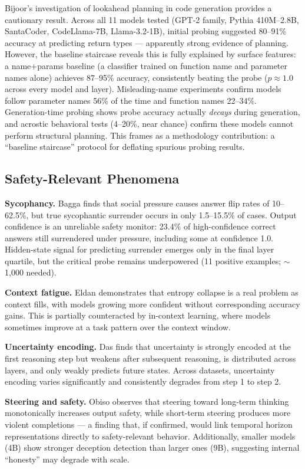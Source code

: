 \documentclass[midterm]{sparreport}
\begin{document}
Bijoor's investigation of lookahead planning in code generation provides a cautionary result. Across all 11 models tested (GPT-2 family, Pythia 410M--2.8B, SantaCoder, CodeLlama-7B, Llama-3.2-1B), initial probing suggested 80--91\% accuracy at predicting return types --- apparently strong evidence of planning. However, the baseline staircase reveals this is fully explained by surface features: a name+params baseline (a classifier trained on function name and parameter names alone) achieves 87--95\% accuracy, consistently beating the probe ($p \approx 1.0$ across every model and layer). Misleading-name experiments confirm models follow parameter names 56\% of the time and function names 22--34\%. Generation-time probing shows probe accuracy actually \emph{decays} during generation, and acrostic behavioral tests (4--20\%, near chance) confirm these models cannot perform structural planning. This frames as a methodology contribution: a ``baseline staircase'' protocol for deflating spurious probing results.

\subsection{Safety-Relevant Phenomena}

\textbf{Sycophancy.} Bagga finds that social pressure causes answer flip rates of 10--62.5\%, but true sycophantic surrender occurs in only 1.5--15.5\% of cases. Output confidence is an unreliable safety monitor: 23.4\% of high-confidence correct answers still surrendered under pressure, including some at confidence 1.0. Hidden-state signal for predicting surrender emerges only in the final layer quartile, but the critical probe remains underpowered (11 positive examples; $\sim$1,000 needed).

\textbf{Context fatigue.} Eldan demonstrates that entropy collapse is a real problem as context fills, with models growing more confident without corresponding accuracy gains. This is partially counteracted by in-context learning, where models sometimes improve at a task pattern over the context window.

\textbf{Uncertainty encoding.} Das finds that uncertainty is strongly encoded at the first reasoning step but weakens after subsequent reasoning, is distributed across layers, and only weakly predicts future states. Across datasets, uncertainty encoding varies significantly and consistently degrades from step 1 to step 2.

\textbf{Steering and safety.} Obiso observes that steering toward long-term thinking monotonically increases output safety, while short-term steering produces more violent completions --- a finding that, if confirmed, would link temporal horizon representations directly to safety-relevant behavior. Additionally, smaller models (4B) show stronger deception detection than larger ones (9B), suggesting internal ``honesty'' may degrade with scale.
\end{document}
